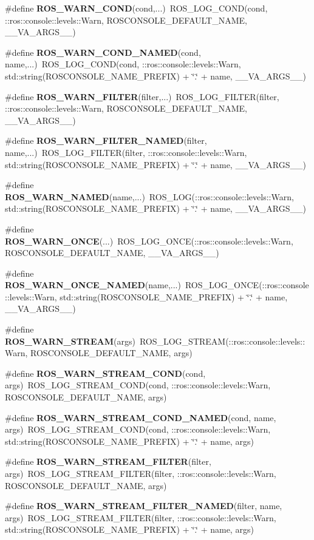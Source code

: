 \begin{DoxyCompactItemize}
\#define {\bf ROS\_\-WARN\_\-COND}(cond,...)~ROS\_\-LOG\_\-COND(cond, ::ros::console::levels::Warn, ROSCONSOLE\_\-DEFAULT\_\-NAME, \_\-\_\-VA\_\-ARGS\_\-\_\-)
\item 
\#define {\bf ROS\_\-WARN\_\-COND\_\-NAMED}(cond, name,...)~ROS\_\-LOG\_\-COND(cond, ::ros::console::levels::Warn, std::string(ROSCONSOLE\_\-NAME\_\-PREFIX) + \char`\"{}.\char`\"{} + name, \_\-\_\-VA\_\-ARGS\_\-\_\-)
\item 
\#define {\bf ROS\_\-WARN\_\-FILTER}(filter,...)~ROS\_\-LOG\_\-FILTER(filter, ::ros::console::levels::Warn, ROSCONSOLE\_\-DEFAULT\_\-NAME, \_\-\_\-VA\_\-ARGS\_\-\_\-)
\item 
\#define {\bf ROS\_\-WARN\_\-FILTER\_\-NAMED}(filter, name,...)~ROS\_\-LOG\_\-FILTER(filter, ::ros::console::levels::Warn, std::string(ROSCONSOLE\_\-NAME\_\-PREFIX) + \char`\"{}.\char`\"{} + name, \_\-\_\-VA\_\-ARGS\_\-\_\-)
\item 
\#define {\bf ROS\_\-WARN\_\-NAMED}(name,...)~ROS\_\-LOG(::ros::console::levels::Warn, std::string(ROSCONSOLE\_\-NAME\_\-PREFIX) + \char`\"{}.\char`\"{} + name, \_\-\_\-VA\_\-ARGS\_\-\_\-)
\item 
\#define {\bf ROS\_\-WARN\_\-ONCE}(...)~ROS\_\-LOG\_\-ONCE(::ros::console::levels::Warn, ROSCONSOLE\_\-DEFAULT\_\-NAME, \_\-\_\-VA\_\-ARGS\_\-\_\-)
\item 
\#define {\bf ROS\_\-WARN\_\-ONCE\_\-NAMED}(name,...)~ROS\_\-LOG\_\-ONCE(::ros::console::levels::Warn, std::string(ROSCONSOLE\_\-NAME\_\-PREFIX) + \char`\"{}.\char`\"{} + name, \_\-\_\-VA\_\-ARGS\_\-\_\-)
\item 
\#define {\bf ROS\_\-WARN\_\-STREAM}(args)~ROS\_\-LOG\_\-STREAM(::ros::console::levels::Warn, ROSCONSOLE\_\-DEFAULT\_\-NAME, args)
\item 
\#define {\bf ROS\_\-WARN\_\-STREAM\_\-COND}(cond, args)~ROS\_\-LOG\_\-STREAM\_\-COND(cond, ::ros::console::levels::Warn, ROSCONSOLE\_\-DEFAULT\_\-NAME, args)
\item 
\#define {\bf ROS\_\-WARN\_\-STREAM\_\-COND\_\-NAMED}(cond, name, args)~ROS\_\-LOG\_\-STREAM\_\-COND(cond, ::ros::console::levels::Warn, std::string(ROSCONSOLE\_\-NAME\_\-PREFIX) + \char`\"{}.\char`\"{} + name, args)
\item 
\#define {\bf ROS\_\-WARN\_\-STREAM\_\-FILTER}(filter, args)~ROS\_\-LOG\_\-STREAM\_\-FILTER(filter, ::ros::console::levels::Warn, ROSCONSOLE\_\-DEFAULT\_\-NAME, args)
\item 
\#define {\bf ROS\_\-WARN\_\-STREAM\_\-FILTER\_\-NAMED}(filter, name, args)~ROS\_\-LOG\_\-STREAM\_\-FILTER(filter, ::ros::console::levels::Warn, std::string(ROSCONSOLE\_\-NAME\_\-PREFIX) + \char`\"{}.\char`\"{} + name, args)

\end{DoxyCompactItemize}
